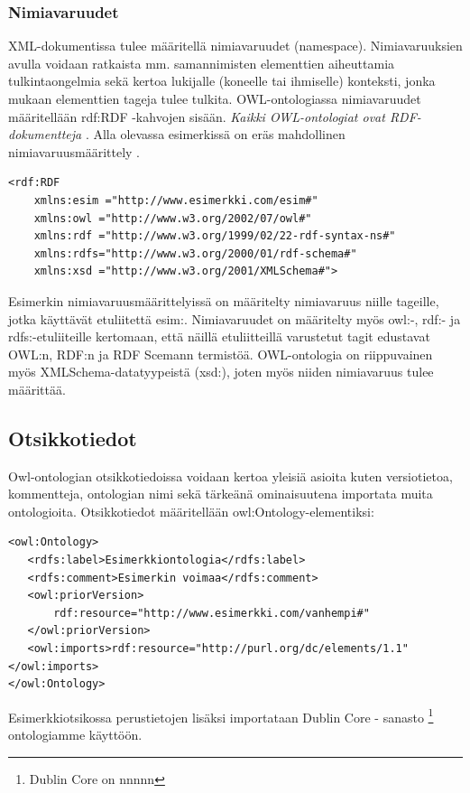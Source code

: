 \documentclass[finnish]{tktltiki2}
\theoremstyle{definition}
\theoremstyle{remark}
\begin{document}
\subsubsection{Nimiavaruudet}
XML-dokumentissa tulee määritellä nimiavaruudet (namespace). Nimiavaruuksien
avulla voidaan ratkaista mm. samannimisten elementtien aiheuttamia
tulkintaongelmia sekä kertoa lukijalle (koneelle tai ihmiselle) konteksti, jonka
mukaan elementtien tageja tulee tulkita. OWL-ontologiassa nimiavaruudet
määritellään rdf:RDF -kahvojen sisään. \textit{Kaikki OWL-ontologiat ovat RDF-dokumentteja} \cite{SWM04}. Alla olevassa esimerkissä on eräs mahdollinen nimiavaruusmäärittely . 
\begin{verbatim}
<rdf:RDF 
    xmlns:esim ="http://www.esimerkki.com/esim#" 
    xmlns:owl ="http://www.w3.org/2002/07/owl#"
    xmlns:rdf ="http://www.w3.org/1999/02/22-rdf-syntax-ns#"
    xmlns:rdfs="http://www.w3.org/2000/01/rdf-schema#"
    xmlns:xsd ="http://www.w3.org/2001/XMLSchema#">
\end{verbatim}
Esimerkin nimiavaruusmäärittelyissä on määritelty nimiavaruus niille tageille, jotka käyttävät etuliitettä esim:. 
Nimiavaruudet on määritelty myös owl:-, rdf:- ja rdfs:-etuliiteille kertomaan, että näillä
etuliitteillä varustetut tagit edustavat OWL:n, RDF:n ja RDF Scemann termistöä.
OWL-ontologia on riippuvainen myös XMLSchema-datatyypeistä (xsd:), joten myös niiden
nimiavaruus tulee määrittää. 

\subsection{Otsikkotiedot}
Owl-ontologian otsikkotiedoissa voidaan kertoa yleisiä asioita kuten versiotietoa, kommentteja, ontologian nimi sekä
tärkeänä ominaisuutena importata muita ontologioita. Otsikkotiedot määritellään owl:Ontology-elementiksi: 
\begin{verbatim}
<owl:Ontology>
   <rdfs:label>Esimerkkiontologia</rdfs:label>
   <rdfs:comment>Esimerkin voimaa</rdfs:comment>
   <owl:priorVersion>
       rdf:resource="http://www.esimerkki.com/vanhempi#"
   </owl:priorVersion>
   <owl:imports>rdf:resource="http://purl.org/dc/elements/1.1"</owl:imports>
</owl:Ontology>
\end{verbatim}
Esimerkkiotsikossa perustietojen lisäksi importataan Dublin Core - sanasto  \footnote{Dublin Core on nnnnn}  ontologiamme käyttöön.
\end{document}
